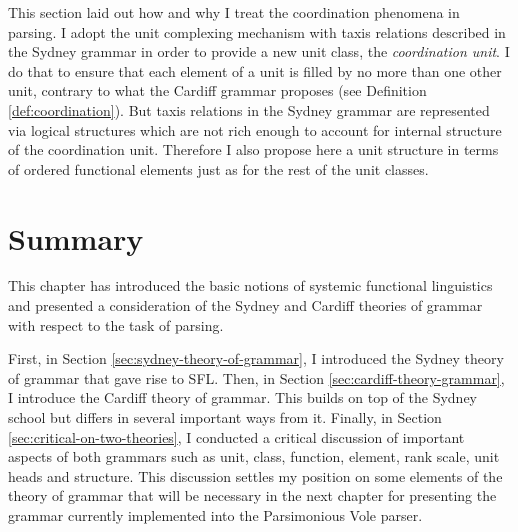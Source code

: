     
    
    This section laid out how and why I treat the coordination phenomena in parsing. I adopt the unit complexing mechanism with taxis relations described in the Sydney grammar in order to provide a new unit class, the \textit{coordination unit}. I do that to ensure that each element of a unit is filled by no more than one other unit, contrary to what the Cardiff grammar proposes (see Definition \ref{def:coordination}). But taxis relations in the Sydney grammar are represented via logical structures which are not rich enough to account for internal structure of the coordination unit. Therefore I also propose here a unit structure in terms of ordered functional elements just as for the rest of the unit classes. 

\section{Summary}
    This chapter has introduced the basic notions of systemic functional linguistics and presented a consideration of the Sydney and Cardiff theories of grammar with respect to the task of parsing.
    
    First, in Section \ref{sec:sydney-theory-of-grammar}, I introduced the Sydney theory of grammar that gave rise to SFL. Then, in Section \ref{sec:cardiff-theory-grammar}, I introduce the Cardiff theory of grammar. This builds on top of the Sydney school but differs in several important ways from it. Finally, in Section \ref{sec:critical-on-two-theories}, I conducted a critical discussion of important aspects of both grammars such as unit, class, function, element, rank scale, unit heads and structure. This discussion settles my position on some elements of the theory of grammar that will be necessary in the next chapter for presenting the grammar currently implemented into the Parsimonious Vole parser.

